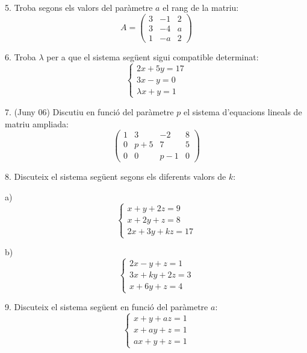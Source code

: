 \documentclass[12pt]{article}
\begin{document}
\begin{exercici}
5. Troba segons els valors del paràmetre \(a\) el rang de la matriu:
\[
A =
\begin{pmatrix}
3 & -1 & 2 \\
3 & -4 & a \\
1 & -a & 2
\end{pmatrix}
\]
\end{exercici}

\begin{exercici}
6. Troba \(\lambda\) per a que el sistema següent sigui compatible determinat:
\[
\begin{cases}
2x + 5y = 17 \\
3x - y = 0 \\
\lambda x + y = 1
\end{cases}
\]
\end{exercici}

\begin{exercici}
7. (Juny 06) Discutiu en funció del paràmetre \(p\) el sistema d’equacions lineals de matriu ampliada:
\[
\begin{pmatrix}
1 & 3 & -2 & 8 \\
0 & p+5 & 7 & 5 \\
0 & 0 & p-1 & 0
\end{pmatrix}
\]
\end{exercici}

\begin{exercici}
8. Discuteix el sistema següent segons els diferents valors de \(k\):

a)
\[
\begin{cases}
x + y + 2z = 9 \\
x + 2y + z = 8 \\
2x + 3y + kz = 17
\end{cases}
\]

b)
\[
\begin{cases}
2x - y + z = 1 \\
3x + ky + 2z = 3 \\
x + 6y + z = 4
\end{cases}
\]
\end{exercici}

\begin{exercici}
9. Discuteix el sistema següent en funció del paràmetre \(a\):
\[
\begin{cases}
x + y + az = 1 \\
x + ay + z = 1 \\
ax + y + z = 1
\end{cases}
\]
\end{exercici}
\end{document}
